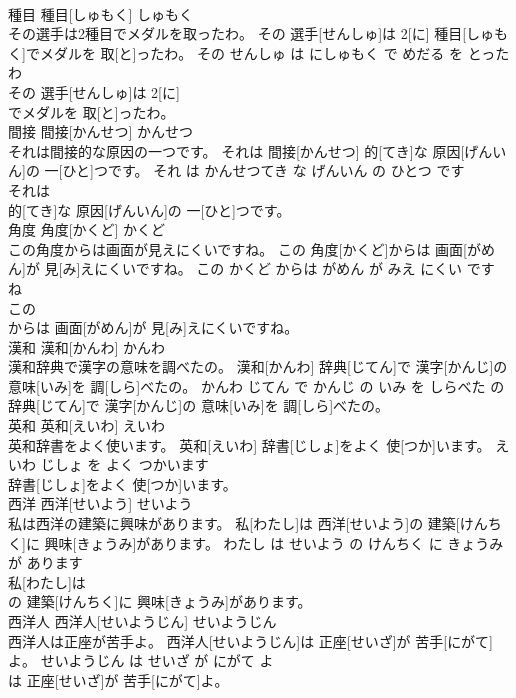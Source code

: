 \documentclass[8pt]{extreport}
\begin{document}
\begin{CJK}{UTF8}{min}
\\	種目	種目[しゅもく]	しゅもく	
\\	その選手は2種目でメダルを取ったわ。	その 選手[せんしゅ]は 2[に] 種目[しゅもく]でメダルを 取[と]ったわ。	その せんしゅ は にしゅもく で めだる を とった わ	
\\	その 選手[せんしゅ]は 2[に]
\\	でメダルを 取[と]ったわ。			
\\	間接	間接[かんせつ]	かんせつ	
\\	それは間接的な原因の一つです。	それは 間接[かんせつ] 的[てき]な 原因[げんいん]の 一[ひと]つです。	それ は かんせつてき な げんいん の ひとつ です	
\\	それは
\\	的[てき]な 原因[げんいん]の 一[ひと]つです。			
\\	角度	角度[かくど]	かくど	
\\	この角度からは画面が見えにくいですね。	この 角度[かくど]からは 画面[がめん]が 見[み]えにくいですね。	この かくど からは がめん が みえ にくい です ね	
\\	この
\\	からは 画面[がめん]が 見[み]えにくいですね。			
\\	漢和	漢和[かんわ]	かんわ	
\\	漢和辞典で漢字の意味を調べたの。	漢和[かんわ] 辞典[じてん]で 漢字[かんじ]の 意味[いみ]を 調[しら]べたの。	かんわ じてん で かんじ の いみ を しらべた の	
\\	辞典[じてん]で 漢字[かんじ]の 意味[いみ]を 調[しら]べたの。			
\\	英和	英和[えいわ]	えいわ	
\\	英和辞書をよく使います。	英和[えいわ] 辞書[じしょ]をよく 使[つか]います。	えいわ じしょ を よく つかいます	
\\	辞書[じしょ]をよく 使[つか]います。			
\\	西洋	西洋[せいよう]	せいよう	
\\	私は西洋の建築に興味があります。	私[わたし]は 西洋[せいよう]の 建築[けんちく]に 興味[きょうみ]があります。	わたし は せいよう の けんちく に きょうみ が あります	
\\	私[わたし]は
\\	の 建築[けんちく]に 興味[きょうみ]があります。			
\\	西洋人	西洋人[せいようじん]	せいようじん	
\\	西洋人は正座が苦手よ。	西洋人[せいようじん]は 正座[せいざ]が 苦手[にがて]よ。	せいようじん は せいざ が にがて よ	
\\	は 正座[せいざ]が 苦手[にがて]よ。			

\end{CJK}
\end{document}
